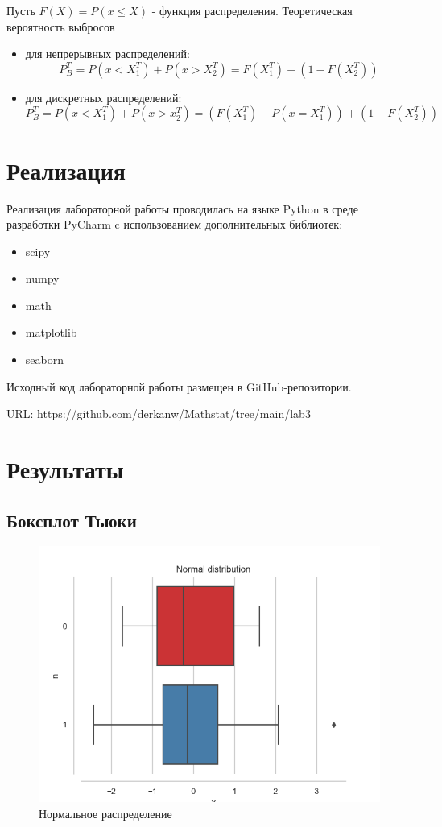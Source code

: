 \documentclass[12pt,a4paper]{article}
\begin{document}
Пусть $F(X)=P(x\leq{X})$ - функция распределения. Теоретическая вероятность выбросов
\begin{itemize}
    \item для непрерывных распределений:
        \begin{equation}
		    P_B^T=P(x<X_1^T)+P(x>X_2^T)=F(X_1^T)+(1-F(X_2^T))
	    \end{equation}
	\item для дискретных распределений:
	    \begin{equation}
		    P_B^T=P(x<X_1^T)+P(x>x_2^T)=(F(X_1^T)-P(x=X_1^T))+(1-F(X_2^T))
	    \end{equation}
\end{itemize}

\section{Реализация}
Реализация лабораторной работы проводилась на языке Python в среде разработки PyCharm c использованием дополнительных библиотек:
\begin{itemize}
    \item scipy
    \item numpy
    \item math
    \item matplotlib
    \item seaborn
\end{itemize}

Исходный код лабораторной работы размещен в GitHub-репозитории.

URL: https://github.com/derkanw/Mathstat/tree/main/lab3

\section {Результаты}
\subsection{Боксплот Тьюки}
\begin{figure}[H]
    \centering
    \includegraphics[scale=0.8]{images/normal.png}
    \caption{Нормальное распределение}
    \label{fig:normal}
\end{figure}
\end{document}
